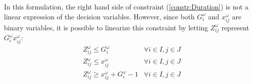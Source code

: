 \documentclass[11pt]{article}
\begin{document}
In this formulation, the right hand side of constraint (\ref{constr:Duration}) is not a linear expression of the decision variables. However, since both \(G_i^\omega\) and \(x_{ij}^\omega\) are binary variables, it is possible to linearize this constraint by letting \(Z_{ij}^\omega\) represent \(G_i^\omega x_{ij}^\omega\):
	\begin{subequations}
		\begin{align*}
		& Z_{ij}^\omega \leq G_i^\omega & \forall i \in I, j \in J\\
		& Z_{ij}^\omega \leq x_{ij}^\omega & \forall i \in I, j \in J\\
		& Z_{ij}^\omega \geq x_{ij}^\omega + G_i^\omega - 1 & \forall i \in I, j \in J
		\end{align*}
	\end{subequations}
\end{document}
